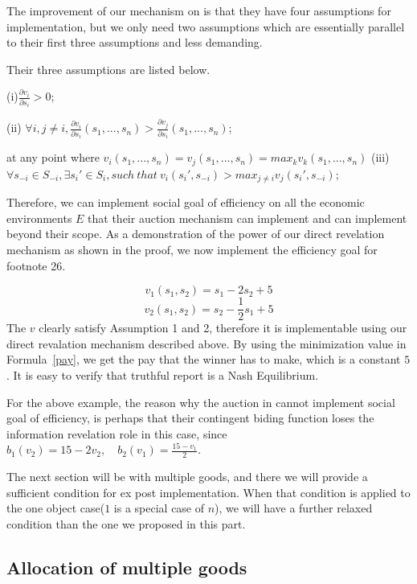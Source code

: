 The improvement of our mechanism on \parencite{Maskin00} is that they have four assumptions for implementation, but we only need two 
assumptions which are essentially parallel to their first three assumptions and less demanding. 

Their three assumptions are listed below.

(i)$\frac{\partial v_i}{\partial s_i} > 0$;

(ii) $\forall i, j \not = i, \frac{\partial v_i}{\partial s_i}(s_1,...,s_n)
> \frac{\partial v_j}{\partial s_i}(s_1,...,s_n)$;

at any point where $v_i(s_1,...,s_n) = v_j(s_1,...,s_n)= max_k v_k(s_1,...,s_n)$
(iii)$ \forall s_{-i} \in S_{-i}, \exists s_i' \in S_i, such\ that\ v_i(s_i', s_{-i}) > max_{j\not=i}v_j(s_i', s_{-i})$;


Therefore, we can implement social
 goal of efficiency on all the economic  environments $E$ that their auction mechanism can implement and can implement beyond their
 scope. As a demonstration of the power of our direct revelation mechanism as shown in the proof, we now implement the efficiency 
 goal for \parencite{Maskin00} footnote 26.
 
\begin{example}
$$v_1(s_1,s_2)=s_1-2s_2+5$$
$$v_2(s_1,s_2)=s_2-\frac{1}{2}s_1+5$$
The $v$ clearly satisfy Assumption 1 and 2, therefore it is implementable using our direct revalation mechanism described above. By
using the minimization value in Formula~\ref{pay}, we get the pay that the winner has to make,  which is a constant $5$. It is easy to verify that truthful report is a Nash Equilibrium.
 
\end{example}
For the above example, the reason why the auction in \parencite{Maskin00} cannot implement social goal of efficiency, is perhaps that 
their contingent biding function loses the information revelation role in this case, since 
$b_1(v_2)=15-2v_2,\quad b_2(v_1)=\frac{15-v_1}{2}$.

The next section will be with multiple goods, and there we will provide a sufficient condition for ex post implementation. When that condition is applied to the one object case($1$ is a special case of $n$), we will have a further relaxed condition than the one we proposed in this part.
\subsection{Allocation of multiple goods}
\label{sec:allocation_of_multiple_goods}

